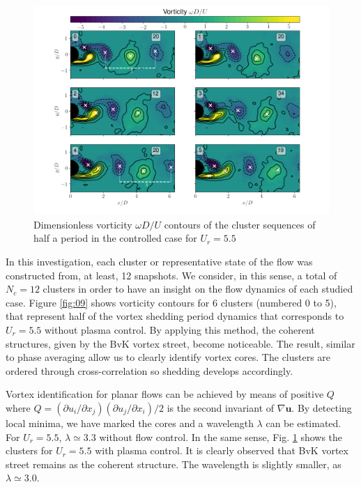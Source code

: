 \documentclass[review]{elsarticle}
\begin{document}
\begin{figure}[h]
\centering 
	\includegraphics[width=\textwidth]{Figures/Fig_10}
	\caption{Dimensionless vorticity $\omega D/U$ contours of the cluster sequences of half a period in the controlled case for $U_r=5.5$}
	\label{fig:10}
\end{figure}

In this investigation, each cluster or representative state of the flow was constructed from, at least, 12 snapshots. We consider, in this sense, a total of $N_c=12$ clusters in order to have an insight on the flow dynamics of each studied case. Figure \ref{fig:09} shows  vorticity contours for 6 clusters (numbered 0 to 5), that represent half of the vortex shedding period dynamics that corresponds to $U_r=5.5$ without plasma control. By applying this method, the coherent structures, given by the BvK vortex street, become noticeable. The result, similar to phase averaging allow us to clearly identify vortex cores. The clusters are ordered through cross-correlation so shedding develops accordingly.

Vortex identification for planar flows can be achieved by means of positive $Q$ where  $Q=(\partial u_i / \partial x_j)( \partial u_j/\partial x_i)/2$ is the second invariant of $\nabla \mathbf u$. By detecting local minima, we have marked the cores and a wavelength $\lambda$ can be estimated. For $U_r=5.5$, $\lambda\simeq 3.3$ without flow control. In the same sense, Fig. \ref{fig:10} shows the clusters for $U_r=5.5$ with plasma control. It is clearly observed that BvK vortex street remains as the coherent structure. The wavelength is slightly smaller, as $\lambda\simeq 3.0$. 
\end{document}
